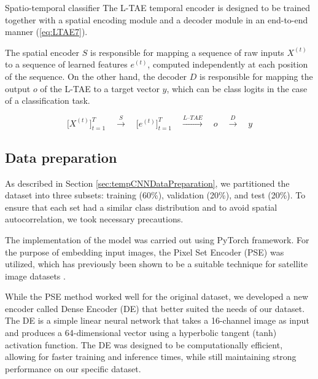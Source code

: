 \begin{paragraph}{ Spatio-temporal classifier}
The L-TAE temporal encoder is designed to be trained together with a spatial encoding module and a decoder module in an end-to-end manner (\ref{eq:LTAE7}).
  
The spatial encoder $S$ is responsible for mapping a sequence of raw inputs $X^{(t)}$ to a sequence of learned features $e^{(t)}$, computed independently at each position of the sequence.
On the other hand, the decoder $D$ is responsible for mapping the output $o$ of the L-TAE to a target vector $y$, which can be class logits in the case of a classification task.
\end{paragraph}

\begin{equation}
  \label{eq:LTAE7}
  \Bigr[X^{(t)}\Bigr]^T_{t=1} \quad \xrightarrow{S} \quad \Bigr[e^{(t)}\Bigr]^T_{t=1} \quad \xrightarrow{L\mbox{--}TAE} \quad o \quad \xrightarrow{D} \quad y
\end{equation}


\subsection{Data preparation}

As described in Section \ref{sec:tempCNNDataPreparation}, we partitioned the dataset into three subsets: training (60\%), validation (20\%), and test (20\%). 
To ensure that each set had a similar class distribution and to avoid spatial autocorrelation, we took necessary precautions.

The implementation of the model was carried out using PyTorch framework. For the purpose of embedding input images, the Pixel Set Encoder (PSE) was utilized, which has previously been shown to be a suitable technique for satellite image datasets \cite{garnot2020satellite}.

While the PSE method worked well for the original dataset, we developed a new encoder called Dense Encoder (DE) that better suited the needs of our dataset.
The DE is a simple linear neural network that takes a 16-channel image as input and produces a 64-dimensional vector using a hyperbolic tangent (tanh) activation function. 
The DE was designed to be computationally efficient, allowing for faster training and inference times, while still maintaining strong performance on our specific dataset.


